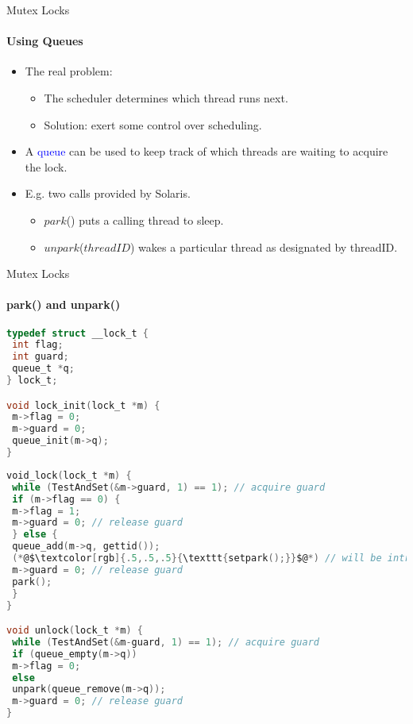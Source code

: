 \documentclass[10pt]{beamer}
\begin{document}
\begin{frame}{Mutex Locks}
\framesubtitle{Using Queues}
\begin{itemize}
 
\item The real problem: 
\begin{itemize}
\item The scheduler determines which thread runs next.
\item Solution: exert some control over scheduling.
\end{itemize}
\item A \textcolor{blue}{queue} can be used to keep track of which threads are waiting to acquire the lock.
\item E.g. two calls provided by Solaris.
\begin{itemize}
\item $park$() puts a calling thread to sleep.
\item $unpark$($threadID$) wakes a particular thread as designated by threadID.
\end{itemize}
\end{itemize}
\end{frame}

\begin{frame}[fragile]{Mutex Locks}
\framesubtitle{park() and unpark()}
\begin{minipage}{.49\linewidth}
\begin{lstlisting}[language=C]
typedef struct __lock_t {
 int flag;
 int guard;
 queue_t *q;
} lock_t;

void lock_init(lock_t *m) {
 m->flag = 0;
 m->guard = 0;
 queue_init(m->q);
}
\end{lstlisting}
\end{minipage}
\hspace{13pt}
\begin{minipage}{.49\linewidth}
\begin{lstlisting}[language=C]
void_lock(lock_t *m) {
 while (TestAndSet(&m->guard, 1) == 1); // acquire guard
 if (m->flag == 0) {
 m->flag = 1;
 m->guard = 0; // release guard
 } else {
 queue_add(m->q, gettid());
 (*@$\textcolor[rgb]{.5,.5,.5}{\texttt{setpark();}}$@*) // will be introduced
 m->guard = 0; // release guard
 park();
 }
}

void unlock(lock_t *m) {
 while (TestAndSet(&m-guard, 1) == 1); // acquire guard
 if (queue_empty(m->q))
 m->flag = 0;
 else
 unpark(queue_remove(m->q));
 m->guard = 0; // release guard
}
\end{lstlisting}
\end{minipage}
\end{frame}
\end{document}
